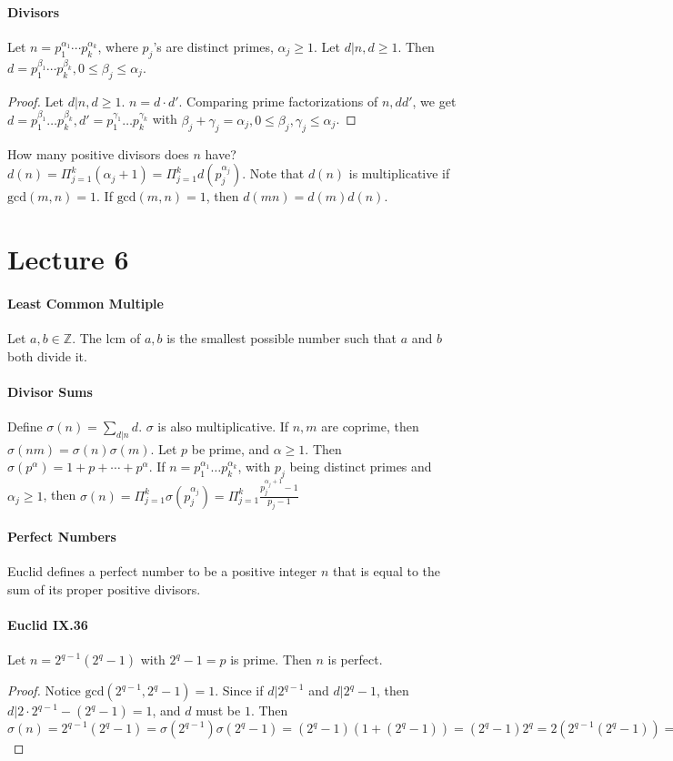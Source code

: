 \documentclass[10pt,letter]{article}
\theoremstyle{plain}
\theoremstyle{definition}
\begin{document}
\paragraph{Divisors}
Let $n=p_1^{\alpha_1}\cdots p_k^{\alpha_k}$, where $p_j$'s are distinct primes, $\alpha_j\geq1$. Let $d|n,d\geq1$. Then $d=p_1^{\beta_1}\cdots p_k^{\beta_k},0\leq\beta_j\leq\alpha_j$.
\begin{proof}
     Let $d|n,d\geq1$. $n=d\cdot d'$. Comparing prime factorizations of $n,dd'$, we get $d=p_1^{\beta_1}\ldots p_k^{\beta_k},d'=p_1^{\gamma_1}\ldots p_k^{\gamma_k}$ with $\beta_j+\gamma_j=\alpha_j,0\leq\beta_j,\gamma_j\leq\alpha_j$. 
\end{proof}
How many positive divisors does $n$ have? $d(n)=\Pi_{j=1}^k(\alpha_j+1)=\Pi_{j=1}^kd(p_j^{\alpha_j})$. Note that $d(n)$ is multiplicative if $\text{gcd}(m,n)=1$. If $\text{gcd}(m,n)=1$, then $d(mn)=d(m)d(n)$. 

\section*{Lecture 6}
\paragraph{Least Common Multiple}
Let $a,b\in\mathbb{Z}$. The lcm of $a,b$ is the smallest possible number such that $a$ and $b$ both divide it. 
\paragraph{Divisor Sums}
Define $\sigma(n)=\sum_{d|n}d$. $\sigma$ is also multiplicative. If $n,m$ are coprime, then $\sigma(nm)=\sigma(n)\sigma(m)$. Let $p$ be prime, and $\alpha\geq1$. Then $\sigma(p^\alpha)=1+p+\cdots+p^\alpha$. If $n=p_1^{\alpha_1}\ldots p_k^{\alpha_k}$, with $p_j$ being distinct primes and $\alpha_j\geq1$, then $\sigma(n)=\Pi_{j=1}^k\sigma(p_j^{\alpha_j})=\Pi_{j=1}^k\frac{p_j^{\alpha_j+1}-1}{p_j-1}$

\paragraph{Perfect Numbers}
Euclid defines a perfect number to be a positive integer $n$ that is equal to the sum of its proper positive divisors. 
\paragraph{Euclid IX.36} 
Let $n=2^{q-1}(2^q-1)$ with $2^q-1=p$ is prime. Then $n$ is perfect. 
\begin{proof}
     Notice $\text{gcd}(2^{q-1},2^q-1)=1$. Since if $d|2^{q-1}$ and $d|2^q-1$, then $d|2\cdot 2^{q-1}-(2^q-1)=1$, and $d$ must be $1$. Then $\sigma(n)=2^{q-1}(2^q-1)=\sigma(2^{q-1})\sigma(2^q-1)=(2^q-1)(1+(2^q-1))=(2^q-1)2^q=2(2^{q-1}(2^q-1))=2n$
\end{proof}
\end{document}
